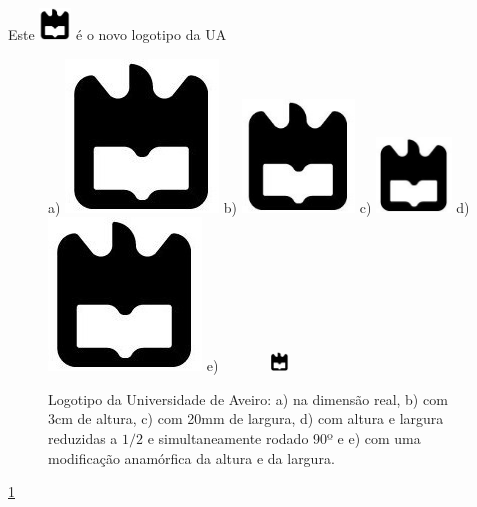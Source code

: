 \documentclass[a4paper]{report}
\begin{document}
Este
\includegraphics[height=24pt]{ua}
é o novo logotipo da UA

\begin{figure}[h]
\center %
a) \includegraphics{ua}
b) \includegraphics[height=3cm]{ua}
c) \includegraphics[width=20mm]{ua}
d) \includegraphics[scale=.5,angle=90]{ua}
e) \includegraphics[height=5mm,width=3cm]{ua}
\caption{Logotipo da Universidade de Aveiro: a) na dimensão real, b) com 3cm de altura, c) com 20mm de largura, d) com altura e largura reduzidas a $1/2$ e simultaneamente rodado 90º e e) com uma modificação anamórfica da altura e da largura.}
\label{fig:ualogo.2}
\end{figure}

\ref{fig:ualogo.2}
\end{document}
